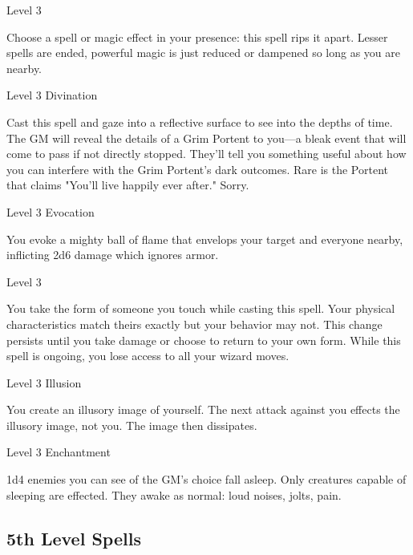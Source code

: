 \startSpellName
          	Level 3
\stopSpellName
       

Choose a spell or magic effect in your presence: this spell rips it apart. Lesser spells are ended, powerful magic is just reduced or dampened so long as you are nearby.

       
\startSpellName
          	Level 3	Divination
\stopSpellName
       

Cast this spell and gaze into a reflective surface to see into the depths of time. The GM will reveal the details of a Grim Portent to you—a bleak event that will come to pass if not directly stopped. They'll tell you something useful about how you can interfere with the Grim Portent's dark outcomes. Rare is the Portent that claims "You'll live happily ever after." Sorry.

       
\startSpellName
          	Level 3	Evocation
\stopSpellName
       

You evoke a mighty ball of flame that envelops your target and everyone nearby, inflicting 2d6 damage which ignores armor.

       
\startSpellName
          	Level 3
\stopSpellName
       

You take the form of someone you touch while casting this spell. Your physical characteristics match theirs exactly but your behavior may not. This change persists until you take damage or choose to return to your own form. While this spell is ongoing, you lose access to all your wizard moves.

       
\startSpellName
          	Level 3	Illusion
\stopSpellName
       

You create an illusory image of yourself. The next attack against you effects the illusory image, not you. The image then dissipates.

       
\startSpellName
          	Level 3	Enchantment
\stopSpellName
       

1d4 enemies you can see of the GM's choice fall asleep. Only creatures capable of sleeping are effected. They awake as normal: loud noises, jolts, pain.

     

     

       
\subsection{5th Level Spells}     
       
